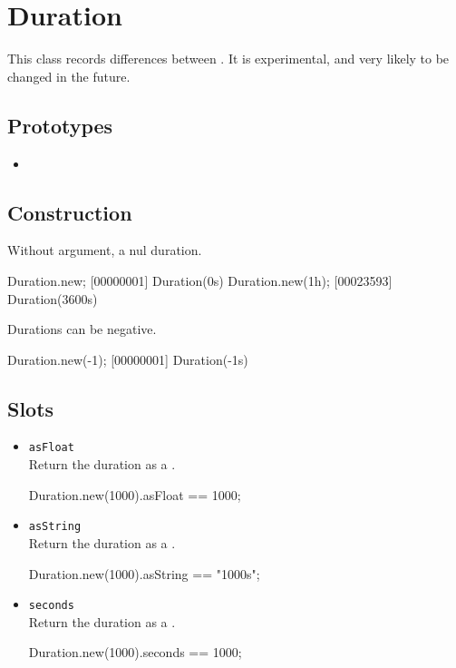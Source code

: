 \section{Duration}

This class records differences between .  It is
experimental, and very likely to be changed in the future.

\subsection{Prototypes}
\begin{itemize}
\item {}
\end{itemize}

\subsection{Construction}

Without argument, a nul duration.

\begin{urbiscript}
Duration.new;
[00000001] Duration(0s)
Duration.new(1h);
[00023593] Duration(3600s)
\end{urbiscript}

Durations can be negative.

\begin{urbiscript}[firstnumber=last]
Duration.new(-1);
[00000001] Duration(-1s)
\end{urbiscript}


\subsection{Slots}

\begin{itemize}
\item \lstinline|asFloat|\\
  Return the duration as a .
\begin{urbiassert}[firstnumber=last]
Duration.new(1000).asFloat == 1000;
\end{urbiassert}

\item \lstinline|asString|\\
  Return the duration as a .
\begin{urbiassert}[firstnumber=last]
Duration.new(1000).asString == "1000s";
\end{urbiassert}

\item \lstinline|seconds|\\
  Return the duration as a .
\begin{urbiassert}[firstnumber=last]
Duration.new(1000).seconds == 1000;
\end{urbiassert}
\end{itemize}


